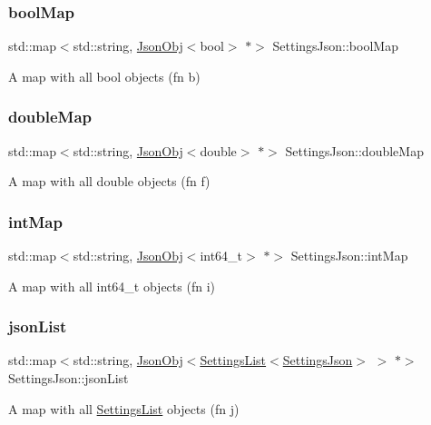 \subsubsection{\texorpdfstring{bool\+Map}{boolMap}}
{\footnotesize\ttfamily std\+::map$<$std\+::string, \hyperlink{class_json_obj}{Json\+Obj}$<$bool$>$ $\ast$$>$ Settings\+Json\+::bool\+Map}

A map with all bool objects (fn b) \mbox{\label{class_settings_json_adcdcce079145c37461af329511cd1c25}} 
\subsubsection{\texorpdfstring{double\+Map}{doubleMap}}
{\footnotesize\ttfamily std\+::map$<$std\+::string, \hyperlink{class_json_obj}{Json\+Obj}$<$double$>$ $\ast$$>$ Settings\+Json\+::double\+Map}

A map with all double objects (fn f) \mbox{\label{class_settings_json_a0e4166c9ce03889e5afdec95d14558a4}} 
\subsubsection{\texorpdfstring{int\+Map}{intMap}}
{\footnotesize\ttfamily std\+::map$<$std\+::string, \hyperlink{class_json_obj}{Json\+Obj}$<$int64\+\_\+t$>$ $\ast$$>$ Settings\+Json\+::int\+Map}

A map with all int64\+\_\+t objects (fn i) \mbox{\label{class_settings_json_a689e48666555a947bbeca14554f2baa9}} 
\subsubsection{\texorpdfstring{json\+List}{jsonList}}
{\footnotesize\ttfamily std\+::map$<$std\+::string, \hyperlink{class_json_obj}{Json\+Obj}$<$\hyperlink{class_settings_list}{Settings\+List}$<$\hyperlink{class_settings_json}{Settings\+Json}$>$ $>$ $\ast$$>$ Settings\+Json\+::json\+List}

A map with all \hyperlink{class_settings_list}{Settings\+List} objects (fn j) \mbox{\label{class_settings_json_a53d8eda20a8dc989065225b7064f4211}} 
